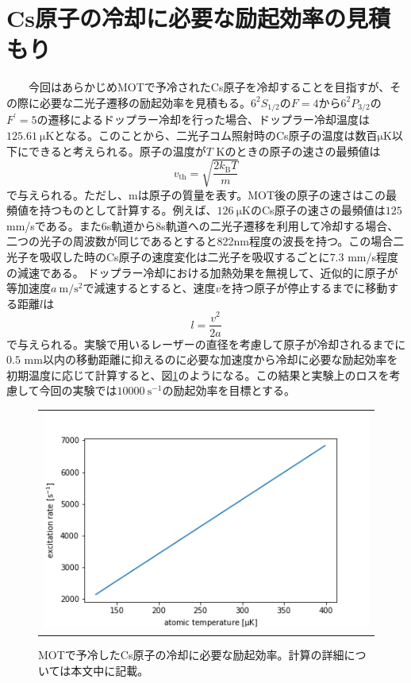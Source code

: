 \documentclass[uplatex, dvipdfmx, a4paper, report, papersize, 11pt]{jsbook}
\begin{document}
\section{Cs原子の冷却に必要な励起効率の見積もり}
　　今回はあらかじめMOTで予冷されたCs原子を冷却することを目指すが、その際に必要な二光子遷移の励起効率を見積もる。$6 ^ { 2 } S _ { 1 / 2 }$の$F = 4$から$6 ^ { 2 } P _ { 3 / 2 }$の$F ^ { \prime } = 5$の遷移によるドップラー冷却を行った場合、ドップラー冷却温度は$125.61\ \mathrm{\mu K}$となる\cite{Cs_level_diagram}。このことから、二光子コム照射時のCs原子の温度は数百$\mathrm{\mu K}$以下にできると考えられる。原子の温度が$T$ Kのときの原子の速さの最頻値は
\begin{equation}
  v _ { \mathrm { th } } = \sqrt { \frac { 2 k _ { \mathrm { B } } T } { m }}
\end{equation}
で与えられる。ただし、mは原子の質量を表す。MOT後の原子の速さはこの最頻値を持つものとして計算する。例えば、$126\ \mathrm{\mu K}$のCs原子の速さの最頻値は$125$ mm/sである。また6s軌道から8s軌道への二光子遷移を利用して冷却する場合、二つの光子の周波数が同じであるとすると822nm程度の波長を持つ。この場合二光子を吸収した時のCs原子の速度変化は二光子を吸収するごとに$7.3$ mm/s程度の減速である。
ドップラー冷却における加熱効果を無視して、近似的に原子が等加速度$a\ \mathrm{m/s^2}$で減速するとすると、速度$v$を持つ原子が停止するまでに移動する距離$l$は
\begin{equation}
    l = \frac{v^2}{2a}
\end{equation}
で与えられる。実験で用いるレーザーの直径を考慮して原子が冷却されるまでに$0.5$ mm以内の移動距離に抑えるのに必要な加速度から冷却に必要な励起効率を初期温度に応じて計算すると、図\ref{necessary_excitation_rate}のようになる。この結果と実験上のロスを考慮して今回の実験では$10000\ \mathrm{s^{-1}}$の励起効率を目標とする。
\begin{figure}[htpb]
  \centering
    \begin{tabular}{c}
      \begin{minipage}{1\hsize}
        \centering
          \includegraphics[keepaspectratio,  scale=0.6,  angle=0]
                          {figures/chapter3/necessary_excitation_rate.png}
                          \caption{MOTで予冷したCs原子の冷却に必要な励起効率。計算の詳細については本文中に記載。}
                          \label{necessary_excitation_rate}

      \end{minipage}
    \end{tabular}
\end{figure}
\end{document}
